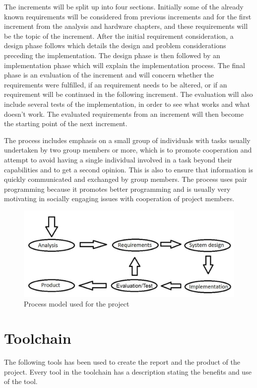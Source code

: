 The increments will be split up into four sections. Initially some of the already known requirements will be considered from previous increments and for the first increment from the analysis and hardware chapters, and these requirements will be the topic of the increment.
After the initial requirement consideration, a design phase follows which details the design and problem considerations preceding the implementation. The design phase is then followed by an implementation phase which will explain the implementation process. The final phase is an evaluation of the increment and will concern whether the requirements were fulfilled, if an requirement needs to be altered, or if an requirement will be continued in the following increment. The evaluation will also include several tests of the implementation, in order to see what works and what doesn't work. The evaluated requirements from an increment will then become the starting point of the next increment. 

The process includes emphasis on a small group of individuals with tasks usually undertaken by two group members or more, which is to promote cooperation and attempt to avoid having a single individual involved in a task beyond their capabilities and to get a second opinion. This is also to ensure that information is quickly communicated and exchanged by group members. The process uses pair programming because it promotes better programming and is usually very motivating in socially engaging issues with cooperation of project members.

\begin{figure}[h]
\centering
\includegraphics[scale=0.30]{billeder/process-model}
\caption{Process model used for the project}
\label{pm}
\end{figure}

\chapter*{Toolchain}
The following tools has been used to create the report and the product of the project. Every tool in the toolchain has a description stating the benefits and use of the tool.

